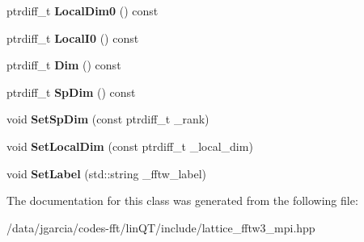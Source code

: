 \begin{DoxyCompactItemize}
\item 
ptrdiff\+\_\+t {\bfseries Local\+Dim0} () const \hypertarget{classLatticeFFTW_a57b45bf5fd5df317338a03b0966197a4}{}\label{classLatticeFFTW_a57b45bf5fd5df317338a03b0966197a4}

\item 
ptrdiff\+\_\+t {\bfseries Local\+I0} () const \hypertarget{classLatticeFFTW_a7e94965e8040cfd52d5eb748a3ead3c2}{}\label{classLatticeFFTW_a7e94965e8040cfd52d5eb748a3ead3c2}

\item 
ptrdiff\+\_\+t {\bfseries Dim} () const \hypertarget{classLatticeFFTW_a20ecf29b123e629944870c871284a4ab}{}\label{classLatticeFFTW_a20ecf29b123e629944870c871284a4ab}

\item 
ptrdiff\+\_\+t {\bfseries Sp\+Dim} () const \hypertarget{classLatticeFFTW_ac00499c4c3041a4ea72b8a07b713c7e2}{}\label{classLatticeFFTW_ac00499c4c3041a4ea72b8a07b713c7e2}

\item 
void {\bfseries Set\+Sp\+Dim} (const ptrdiff\+\_\+t \+\_\+rank)\hypertarget{classLatticeFFTW_a3c7c94e85369793249813230f9f8b753}{}\label{classLatticeFFTW_a3c7c94e85369793249813230f9f8b753}

\item 
void {\bfseries Set\+Local\+Dim} (const ptrdiff\+\_\+t \+\_\+local\+\_\+dim)\hypertarget{classLatticeFFTW_a32f043076727755428782c1ac63e20a2}{}\label{classLatticeFFTW_a32f043076727755428782c1ac63e20a2}

\item 
void {\bfseries Set\+Label} (std\+::string \+\_\+fftw\+\_\+label)\hypertarget{classLatticeFFTW_aff50ec2bf82d44c8d0814ff56f683296}{}\label{classLatticeFFTW_aff50ec2bf82d44c8d0814ff56f683296}

\end{DoxyCompactItemize}


The documentation for this class was generated from the following file\+:\begin{DoxyCompactItemize}
\item 
/data/jgarcia/codes-\/fft/lin\+Q\+T/include/lattice\+\_\+fftw3\+\_\+mpi.\+hpp\end{DoxyCompactItemize}
